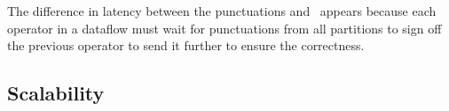 The difference in latency between the punctuations and \tracker\ appears because each operator in a dataflow must wait for punctuations from all partitions to sign off the previous operator to send it further to ensure the correctness. 


\subsection{Scalability}
